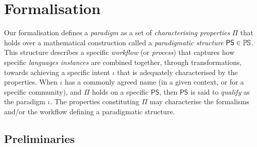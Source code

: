 \section{Formalisation}
\label{sec:Formalisation}

Our formalisation defines a \emph{paradigm} as a set of 
\emph{characterising properties} $\mathsf{\Pi}$ that holds over a mathematical 
construction called a \emph{paradigmatic structure} $\mathsf{PS}\in \mathbb{P}\mskip-1mu\mathbb{S}$. 
This structure describes a specific \emph{workflow} (or \emph{process}) that 
captures how specific \emph{languages instances} are combined together, 
through transformations, towards achieving a specific intent $\iota$ that is 
adequately characterised by the properties. When $\iota$ has a commonly agreed 
name (in a given context, or for a specific community), and $\mathsf{\Pi}$ holds 
on a specific $\mathsf{PS}$, then $\mathsf{PS}$ is said to \emph{qualify} as 
the paradigm $\iota$. The properties constituting $\mathsf{\Pi}$ may 
characterise the formalisms and/or the workflow defining a paradigmatic 
structure. 


\subsection{Preliminaries}
\label{sec:Formalisation-Preliminaries}


